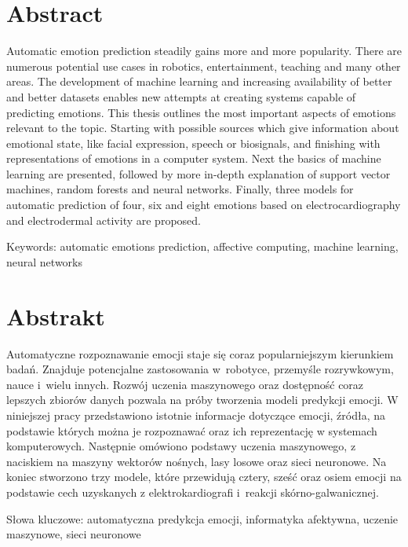 \section*{Abstract}\label{sec:abstract}

Automatic emotion prediction steadily gains more and more popularity.
There are numerous potential use cases in robotics, entertainment, teaching and many other areas.
The development of machine learning and increasing availability of better and better datasets enables new attempts at creating systems capable of predicting emotions.
This thesis outlines the most important aspects of emotions relevant to the topic.
Starting with possible sources which give information about emotional state, like facial expression, speech or biosignals, and finishing with representations of emotions in a computer system.
Next the basics of machine learning are presented, followed by more in-depth explanation of support vector machines, random forests and neural networks.
Finally, three models for automatic prediction of four, six and eight emotions based on electrocardiography and electrodermal activity are proposed.

Keywords: automatic emotions prediction, affective computing, machine learning, neural networks

\section*{Abstrakt}\label{sec:abstrakt}

Automatyczne rozpoznawanie emocji staje się coraz popularniejszym kierunkiem badań.
Znajduje potencjalne zastosowania w~robotyce, przemyśle rozrywkowym, nauce i~wielu innych.
Rozwój uczenia maszynowego oraz dostępność coraz lepszych zbiorów danych pozwala na próby tworzenia modeli predykcji emocji.
W niniejszej pracy przedstawiono istotnie informacje dotyczące emocji, źródła, na podstawie których można je rozpoznawać oraz ich reprezentację w systemach komputerowych.
Następnie omówiono podstawy uczenia maszynowego, z naciskiem na maszyny wektorów nośnych, lasy losowe oraz sieci neuronowe.
Na koniec stworzono trzy modele, które przewidują cztery, sześć oraz osiem emocji na podstawie cech uzyskanych z elektrokardiografi i~reakcji skórno-galwanicznej.

Słowa kluczowe: automatyczna predykcja emocji, informatyka afektywna, uczenie maszynowe, sieci neuronowe
